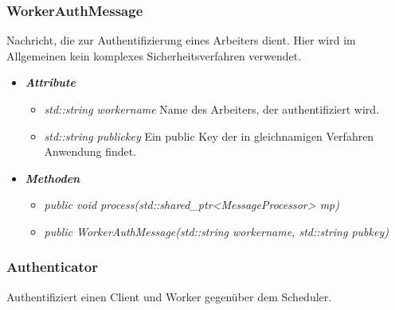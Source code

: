 \documentclass[a4paper,12pt]{article}
\begin{document}
\subsubsection{WorkerAuthMessage}

Nachricht, die zur Authentifizierung eines Arbeiters dient. Hier wird im Allgemeinen kein komplexes Sicherheitsverfahren verwendet.

	\begin{itemize}[label={}]

	\item\textit{\textbf{Attribute}}
		\begin{itemize}[label={\textbullet}]
			\item\textit{std::string workername} Name des Arbeiters, der authentifiziert wird.
			\item\textit{std::string publickey} Ein public Key der in gleichnamigen Verfahren Anwendung findet.
		\end{itemize}

	\item\textit{\textbf{Methoden}}
		\begin{itemize}[label={\textbullet}]
			\item\textit{public void process(std::shared\_ptr<MessageProcessor> mp)}
			\item\textit{public WorkerAuthMessage(std::string workername, std::string pubkey)}
		\end{itemize}

\end{itemize}

\subsubsection{Authenticator}

Authentifiziert einen Client und Worker gegenüber dem Scheduler.
\end{document}
